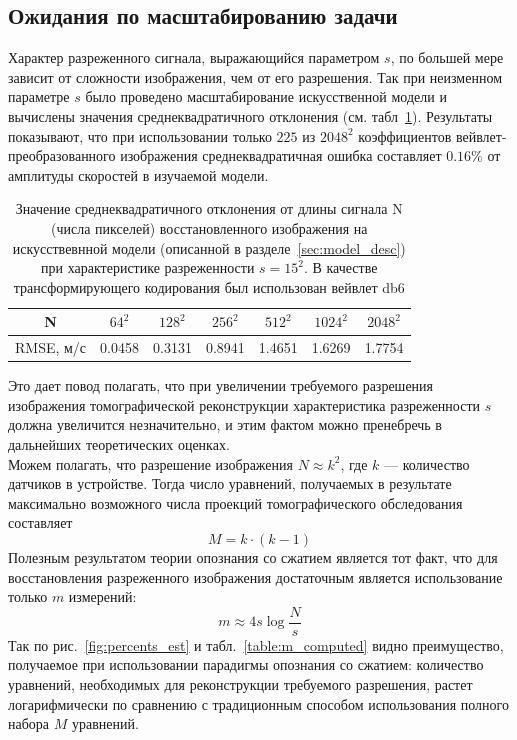 \documentclass[14pt]{matmex-diploma}
\begin{document}
\subsection{Ожидания по масштабированию задачи}
Характер разреженного сигнала, выражающийся параметром $s$, по большей мере зависит от сложности изображения, чем от его разрешения. Так при неизменном параметре $s$ было проведено масштабирование искусственной модели и вычислены значения среднеквадратичного отклонения (см. табл~\ref{table:problem_scaling}). Результаты показывают, что при использовании только $225$ из $2048^2$ коэффициентов вейвлет-преобразованного изображения среднеквадратичная ошибка составляет $0.16\%$ от амплитуды скоростей в изучаемой модели.
\begin{table}[h]
\centering
\begin{tabular}{ c | c | c | c | c | c | c }
    \hline
    N & $64^2$ & $128^2$ & $256^2$ & $512^2$ & $1024^2$ & $2048^2$ \\
    \hline
    RMSE, м/с & 0.0458 & 0.3131 & 0.8941 & 1.4651 & 1.6269 & 1.7754 \\
    \hline
\end{tabular}
\caption{Значение среднеквадратичного отклонения от длины сигнала N (числа пикселей) восстановленного изображения на искусствевнной модели (описанной в разделе~\ref{sec:model_desc}) при характеристике разреженности $s = 15^2$. В качестве трансформирующего кодирования был использован вейвлет db6}
\label{table:problem_scaling}
\end{table}
Это дает повод полагать, что при увеличении требуемого разрешения изображения томографической реконструкции характеристика разреженности $s$ должна увеличится незначительно, и этим фактом можно пренебречь в дальнейших теоретических оценках.\\
Можем полагать, что разрешение изображения $N \approx k^2$, где $k$ --- количество датчиков в устройстве. Тогда число уравнений, получаемых в результате максимально возможного числа проекций томографического обследования составляет \[M = k\cdot (k-1)\] Полезным результатом теории опознания со сжатием является тот факт, что для восстановления разреженного изображения достаточным является использование только $m$ измерений:
\begin{equation}\label{eq:approx_m}
m \approx 4 s  \log{\frac{N}{s}} 
\end{equation}
Так по рис.~\ref{fig:percents_est} и табл.~\ref{table:m_computed} видно преимущество, получаемое при использовании парадигмы опознания со сжатием: количество уравнений, необходимых для реконструкции требуемого разрешения, растет логарифмически по сравнению с традиционным способом использования полного набора $M$ уравнений.
\end{document}
